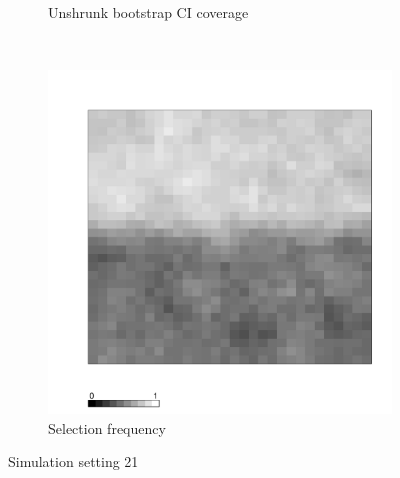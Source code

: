\documentclass[authoryear, review, 11pt]{elsarticle}
\begin{document}
\begin{figure}
\begin{subfigure}[b]{0.45\textwidth}
		\caption{Unshrunk bootstrap CI coverage}
	\end{subfigure}%
	~ %
	\begin{subfigure}[b]{0.45\textwidth}
	\centering
		\includegraphics[width=\textwidth]{../../figures/simulation/X1.15.21.selection.pdf}
		\caption{Selection frequency}
	\end{subfigure}
	\caption{Simulation setting 21}
\end{figure}
\end{document}
